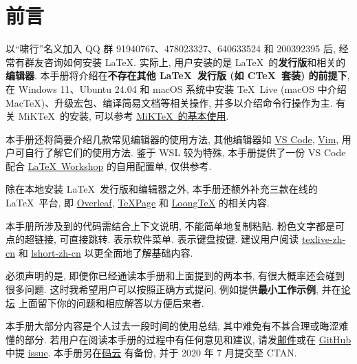 
\chapter*{前言}

以``啸行''名义加入 QQ 群 91940767、478023327、640633524 和 200392395 后,
经常有群友咨询如何安装 \LaTeX.
实际上,
用户安装的是 \LaTeX\ 的\textbf{发行版}和相关的\textbf{编辑器}.
本手册将介绍在\textbf{不存在其他 \LaTeX\ 发行版 (如 C\TeX\ 套装) 的前提下},
在 Windows 11、Ubuntu 24.04 和 macOS 系统中安装
\TeX~Live (macOS 中介绍 Mac\TeX)、升级宏包、编译简易文档等相关操作,
并多以介绍命令行操作为主.
有关 MiK\TeX\ 的安装,
可以参考 \href{https://camusecao.top/2021-06-16/MiKTeX/}{MiK\TeX\ 的基本使用}.

本手册还将简要介绍几款常见编辑器的使用方法,
其他编辑器如 \href{https://code.visualstudio.com/}{VS Code},
\href{https://www.vim.org/}{Vim},
用户可自行了解它们的使用方法.
鉴于 WSL 较为特殊,
本手册提供了一份 VS Code 配合
\href{https://marketplace.visualstudio.com/items?itemName=James-Yu.latex-workshop}{\LaTeX\ Workshop}
的自用配置单,
仅供参考.

除在本地安装 \LaTeX\ 发行版和编辑器之外,
本手册还额外补充三款在线的 \LaTeX\ 平台,
即 \href{http://www.overleaf.com/}{Overleaf},
\href{https://www.texpage.com/}{TeXPage} 和
\href{https://www.loongtex.com/}{LoongTeX} 的相关内容.

本手册所涉及到的代码需结合上下文说明, 不能简单地复制粘贴.
粉色文字都是可点的超链接, 可直接跳转.
 表示软件菜单.  表示键盘按键.
建议用户阅读 \href{https://tug.org/texlive/doc/texlive-zh-cn/texlive-zh-cn.pdf}{\textsf{texlive-zh-cn}}
和 \href{http://mirrors.ctan.org/info/lshort/chinese/lshort-zh-cn.pdf}{\textsf{lshort-zh-cn}}
以更全面地了解基础内容.

必须声明的是,
即便你已经通读本手册和上面提到的两本书,
有很大概率还会碰到很多问题.
这时我希望用户可以按照正确方式提问,
例如提供\textbf{最小工作示例},
并在\href{https://ask.latexstudio.net/}{论坛}%
上面留下你的问题和相应解答以方便后来者.

本手册大部分内容是个人过去一段时间的使用总结, 其中难免有不甚合理或晦涩难懂的部分.
若用户在阅读本手册的过程中有任何意见和建议,
请发\href{mailto:ranwang.osbert@outlook.com}{邮件}或在
\href{https://github.com/OsbertWang/install-latex-guide-zh-cn}{GitHub} 中提
\href{https://github.com/OsbertWang/install-latex-guide-zh-cn/issues}{issue}.
本手册另在\href{https://gitee.com/OsbertWang/install-latex-guide-zh-cn}{码云}%
有备份,
并于 2020 年 7 月提交至 CTAN.

